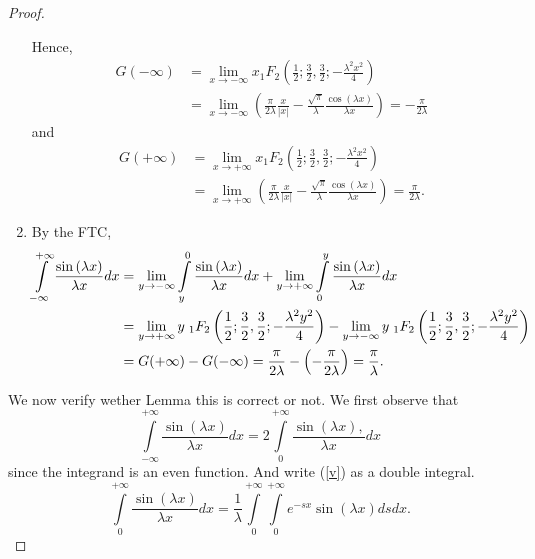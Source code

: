 \documentclass[smallextended]{svjour3}
\begin{document}
\begin{proof}
\begin{enumerate}
\begin{equation}
\end{equation}
Hence,
\begin{align}
G(-\infty)&=\lim_{x\rightarrow-\infty}x{}_1F_2\left(\frac{1}{2};\frac{3}{2},\frac{3}{2};-\frac{\lambda^2 x^2}{4}\right)
\nonumber\\&=\lim_{x\rightarrow-\infty}\left(\frac{\pi}{2\lambda}\frac{x}{|x|}-\frac{\sqrt{\pi}}{\lambda}\frac{\cos{\left({\lambda x}\right)}}{\lambda x}\right)=-\frac{\pi}{2\lambda}
\end{align}
and
\begin{align}
G(+\infty)&=\lim_{x\rightarrow+\infty}x{}_1F_2\left(\frac{1}{2};\frac{3}{2},\frac{3}{2};-\frac{\lambda^2 x^2}{4}\right)
\nonumber\\&=\lim_{x\rightarrow+\infty}\left(\frac{\pi}{2\lambda}\frac{x}{|x|}-\frac{\sqrt{\pi}}{\lambda}\frac{\cos{\left({\lambda x}\right)}}{\lambda x}\right)=\frac{\pi}{2\lambda}.
\end{align}
\item By the FTC,
\begin{align}
\int\limits_{-\infty}^{+\infty} \frac{\sin{(\lambda x)
}}{\lambda x} dx &=\lim_{y\rightarrow-\infty}\int\limits_{y}^{0} \frac{\sin{(\lambda x)
}}{\lambda x} dx
+\lim_{y\rightarrow+\infty}\int\limits_{0}^{y} \frac{\sin{(\lambda x)
}}{\lambda x}dx
\nonumber\\ &=\lim_{y\rightarrow+\infty}y\hspace{.1cm}{}_1F_2\left(\frac{1}{2};\frac{3}{2},\frac{3}{2};-\frac{\lambda^2 y^2}{4}\right)
-\lim_{y\rightarrow-\infty}y\hspace{.1cm}{}_1F_2\left(\frac{1}{2};\frac{3}{2},\frac{3}{2};-\frac{\lambda^2 y^2}{4}\right)
\nonumber\\ &=G(+\infty)-G(-\infty)=\frac{\pi}{2\lambda}-\left(-\frac{\pi}{2\lambda}\right)=\frac{\pi}{\lambda}.
\end{align}
\end{enumerate}
We now verify wether Lemma this is correct or not. We first observe that
\begin{equation}
\int\limits_{-\infty}^{+\infty} \frac{\sin{(\lambda x)
}}{\lambda x} dx=2\int\limits_{0}^{+\infty} \frac{\sin{(\lambda x),
}}{\lambda x} dx
\label{v}
\end{equation}
since the integrand is an even function. And write (\ref{v}) as a double integral.
\begin{equation}
\int\limits_{0}^{+\infty} \frac{\sin{(\lambda x)
}}{\lambda x} dx=\frac{1}{\lambda}\int\limits_{0}^{+\infty}\int\limits_{0}^{+\infty}e^{-s x} {\sin{(\lambda x)}} ds dx.

\end{equation}
\end{proof}
\end{document}
